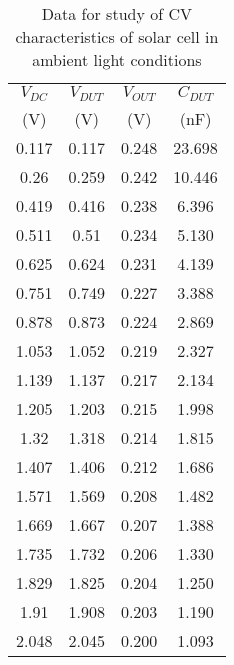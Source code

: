 \begin{table}[]
    \centering
    \begin{tabular}{|c|c|c|c|}
    \hline
    $V_{DC}$ & $V_{DUT}$ & $V_{OUT}$ & $C_{DUT}$ \\ 
    (V) & (V) & (V) & (nF) \\  \hline
    0.117 & 0.117 & 0.248 & 23.698 \\ \hline
    0.26 & 0.259 & 0.242 & 10.446 \\ \hline
    0.419 & 0.416 & 0.238 & 6.396 \\ \hline
    0.511 & 0.51 & 0.234 & 5.130 \\ \hline
    0.625 & 0.624 & 0.231 & 4.139 \\ \hline
    0.751 & 0.749 & 0.227 & 3.388 \\ \hline
    0.878 & 0.873 & 0.224 & 2.869 \\ \hline
    1.053 & 1.052 & 0.219 & 2.327 \\ \hline
    1.139 & 1.137 & 0.217 & 2.134 \\ \hline
    1.205 & 1.203 & 0.215 & 1.998 \\ \hline
    1.32 & 1.318 & 0.214 & 1.815 \\ \hline
    1.407 & 1.406 & 0.212 & 1.686 \\ \hline
    1.571 & 1.569 & 0.208 & 1.482 \\ \hline
    1.669 & 1.667 & 0.207 & 1.388 \\ \hline
    1.735 & 1.732 & 0.206 & 1.330 \\ \hline
    1.829 & 1.825 & 0.204 & 1.250 \\ \hline
    1.91 & 1.908 & 0.203 & 1.190 \\ \hline
    2.048 & 2.045 & 0.200 & 1.093 \\ \hline
    \end{tabular}
    \caption{Data for study of CV characteristics of solar
    cell in ambient light conditions}
    \label{tab:2}
\end{table}